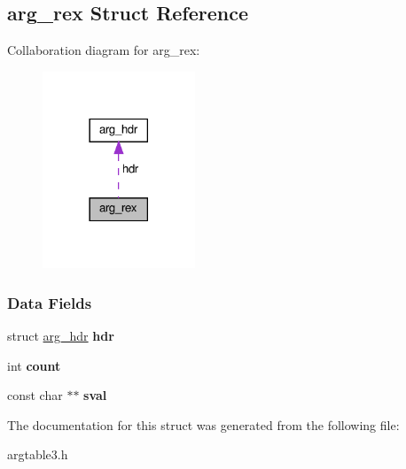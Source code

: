 \hypertarget{structarg__rex}{}\subsection{arg\+\_\+rex Struct Reference}
\label{structarg__rex}


Collaboration diagram for arg\+\_\+rex\+:\nopagebreak
\begin{figure}[H]
\begin{center}
\leavevmode
\includegraphics[width=129pt]{structarg__rex__coll__graph}
\end{center}
\end{figure}
\subsubsection*{Data Fields}
\begin{DoxyCompactItemize}
\item 
\mbox{\label{structarg__rex_af009bf62545082e4d9128f86846bc320}} 
struct \hyperlink{structarg__hdr}{arg\+\_\+hdr} {\bfseries hdr}
\item 
\mbox{\label{structarg__rex_aaf9bd8bfb7d71e067c33dcaaa172fcad}} 
int {\bfseries count}
\item 
\mbox{\label{structarg__rex_a3508cb79a9ff78ac5d074b6fc8a34b31}} 
const char $\ast$$\ast$ {\bfseries sval}
\end{DoxyCompactItemize}


The documentation for this struct was generated from the following file\+:\begin{DoxyCompactItemize}
\item 
argtable3.\+h\end{DoxyCompactItemize}
